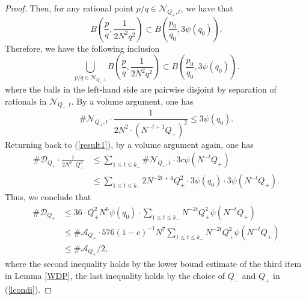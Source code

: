 \documentclass[10pt,a4paper]{amsart}
\begin{document}
\begin{proof}
    Then, for any rational point $p/q\in\mathcal{N}_{Q_+,t}$, we have that
    $$B\left(\frac{p}{q},\frac{1}{2N^2q^2}\right)\subset B\left(\frac{p_0}{q_0},3\psi(q_0)\right).$$
    Therefore, we have the following inclusion
    $$\bigcup_{{p}/{q}\in\mathcal{N}_{Q_+,t}}B\left(\frac{p}{q},\frac{1}{2N^2q^{2}}\right)\subset B\left(\frac{p_0}{q_0},3\psi(q_0)\right).$$
    where the balls in the left-hand side are pairwise disjoint by separation of rationals in $\mathcal{N}_{Q_+,t}$. By a volume argument, one has
    $$\#\mathcal{N}_{Q_+,t}\cdot \frac{1}{2N^2\cdot (N^{-t+1}Q_+)^2}\le 3\psi(q_0).$$
    Returning back to (\ref{result1}), by a volume argument again, one has
    \begin{align*}
         \#\mathcal{D}_{Q_+}\cdot\frac{1}{2N^2\cdot Q_+^2}&\le \sum_{1\le t\le k_-}\#\mathcal{N}_{Q_+,t}\cdot 3c\psi(N^{-t}Q_+)\\
         &\le \sum_{1\le t\le k_-}{2N^{-2t+4}Q_+^2}\cdot3\psi(q_0)\cdot3\psi(N^{-t}Q_+).
    \end{align*}
    Thus, we conclude that
    \begin{align*}
    \#\mathcal{D}_{Q_+}&\le{36 \cdot Q_+^2 N^6}\psi(q_0)\cdot\sum_{1\le t\le k_-}N^{-2t}Q_+^2\psi(N^{-t}Q_+)\\
    &\le\#\mathcal{A}_{Q_+}\cdot 576(1-c)^{-1}N^7\sum_{1\le t\le k_-}N^{-2t}Q_+^2\psi(N^{-t}Q_+)\\
    &\le \#\mathcal{A}_{Q_+}/2,
    \end{align*}
    where the second inequality holds by the lower bound estimate of the third item in Lemma \ref{WDP}, the last inequality holds by the choice of $Q_-$ and $Q_+$ in (\ref{lcondi}).
\end{proof}
\end{document}
